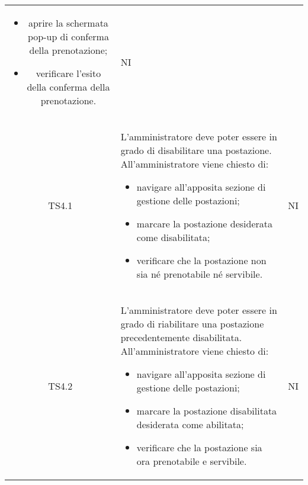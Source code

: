 {\begin{longtable}{ c C{11cm} c }
        \begin{itemize}
            \item aprire la schermata pop-up di conferma della prenotazione;
            \item verificare l'esito della conferma della prenotazione.
        \end{itemize}&
        NI\\
        TS4.1&
        L'amministratore deve poter essere in grado di disabilitare una postazione.\newline
        All'amministratore viene chiesto di:
        \begin{itemize}
            \item navigare all'apposita sezione di gestione delle postazioni;
            \item marcare la postazione desiderata come disabilitata;
            \item verificare che la postazione non sia né prenotabile né servibile.
        \end{itemize}&
        NI\\
        TS4.2&
        L'amministratore deve poter essere in grado di riabilitare una postazione precedentemente disabilitata.\newline
        All'amministratore viene chiesto di:
        \begin{itemize}
            \item navigare all'apposita sezione di gestione delle postazioni;
            \item marcare la postazione disabilitata desiderata come abilitata;
            \item verificare che la postazione sia ora prenotabile e servibile.
        \end{itemize}&
        NI\\
       
        
    \end{longtable}
}